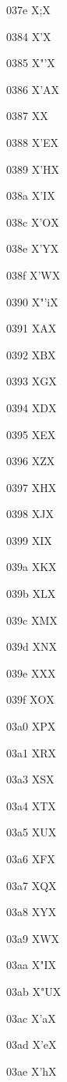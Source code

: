 \documentclass[11pt]{article}
\begin{document}
037e X{;}X

0384 X{\textgreek{'}}X

0385 X{\textgreek{"'}}X

0386 X{\textgreek{'A}}X

0387 X{\textperiodcentered}X

0388 X{\textgreek{'E}}X

0389 X{\textgreek{'H}}X

038a X{\textgreek{'I}}X

038c X{\textgreek{'O}}X

038e X{\textgreek{'Y}}X

038f X{\textgreek{'W}}X

0390 X{\textgreek{"'i}}X

0391 X{\textgreek{A}}X

0392 X{\textgreek{B}}X

0393 X{\textgreek{G}}X

0394 X{\textgreek{D}}X

0395 X{\textgreek{E}}X

0396 X{\textgreek{Z}}X

0397 X{\textgreek{H}}X

0398 X{\textgreek{J}}X

0399 X{\textgreek{I}}X

039a X{\textgreek{K}}X

039b X{\textgreek{L}}X

039c X{\textgreek{M}}X

039d X{\textgreek{N}}X

039e X{\textgreek{X}}X

039f X{\textgreek{O}}X

03a0 X{\textgreek{P}}X

03a1 X{\textgreek{R}}X

03a3 X{\textgreek{S}}X

03a4 X{\textgreek{T}}X

03a5 X{\textgreek{U}}X

03a6 X{\textgreek{F}}X

03a7 X{\textgreek{Q}}X

03a8 X{\textgreek{Y}}X

03a9 X{\textgreek{W}}X

03aa X{\textgreek{"I}}X

03ab X{\textgreek{"U}}X

03ac X{\textgreek{'a}}X

03ad X{\textgreek{'e}}X

03ae X{\textgreek{'h}}X
\end{document}
